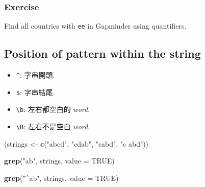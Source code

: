 \documentclass[]{book}
\newenvironment{Shaded}{\begin{snugshade}}{\end{snugshade}}
\newcommand{\KeywordTok}[1]{\textcolor[rgb]{0.13,0.29,0.53}{\textbf{#1}}}
\newcommand{\DataTypeTok}[1]{\textcolor[rgb]{0.13,0.29,0.53}{#1}}
\newcommand{\StringTok}[1]{\textcolor[rgb]{0.31,0.60,0.02}{#1}}
\newcommand{\OtherTok}[1]{\textcolor[rgb]{0.56,0.35,0.01}{#1}}
\newcommand{\NormalTok}[1]{#1}
\providecommand{\tightlist}{%
  \setlength{\itemsep}{0pt}\setlength{\parskip}{0pt}}
\theoremstyle{definition}
\theoremstyle{definition}
\theoremstyle{definition}
\theoremstyle{remark}
\begin{document}
\subsubsection{Exercise}\label{exercise}

Find all countries with \texttt{ee} in Gapminder using quantifiers.

\subsection{Position of pattern within the
string}\label{position-of-pattern-within-the-string}

\begin{itemize}
\tightlist
\item
  \texttt{\^{}}: 字串開頭.\\
\item
  \texttt{\$}: 字串結尾.\\
\item
  \texttt{\textbackslash{}b}: 左右都空白的 \emph{word}.\\
\item
  \texttt{\textbackslash{}B}: 左右不是空白 \emph{word}.
\end{itemize}

\begin{Shaded}
\begin{Highlighting}[]
\NormalTok{(strings <-}\StringTok{ }\KeywordTok{c}\NormalTok{(}\StringTok{"abcd"}\NormalTok{, }\StringTok{"cdab"}\NormalTok{, }\StringTok{"cabd"}\NormalTok{, }\StringTok{"c abd"}\NormalTok{))}
\end{Highlighting}
\end{Shaded}

\begin{Shaded}
\begin{Highlighting}[]
\KeywordTok{grep}\NormalTok{(}\StringTok{"ab"}\NormalTok{, strings, }\DataTypeTok{value =} \OtherTok{TRUE}\NormalTok{)}
\end{Highlighting}
\end{Shaded}

\begin{Shaded}
\begin{Highlighting}[]
\KeywordTok{grep}\NormalTok{(}\StringTok{"^ab"}\NormalTok{, strings, }\DataTypeTok{value =} \OtherTok{TRUE}\NormalTok{)}
\end{Highlighting}
\end{Shaded}

\begin{Shaded}
\end{Shaded}
\end{document}
